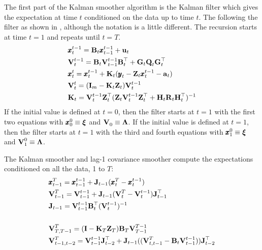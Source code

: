 \documentclass[]{article}
\def\xixi{\mbox{\boldmath $\xi$}}
\def\LAM{\mbox{\boldmath $\Lambda$}}
\def\UPS{\mbox{\boldmath $\Upsilon$}}
\def\XI{\mbox{\boldmath $\Xi$}}
\def\BB{\mbox{$\mathbf B$}}	\def\bb{\mbox{$\mathbf b$}} \def\Bb{\mbox{$\mathbf J$}} \def\Ba{\mbox{$\mathbf L$}} \def\Bm{\UPS}
\def\GG{\mbox{$\mathbf G$}}	\def\gg{\mbox{$\mathbf g$}}
\def\HH{\mbox{$\mathbf H$}}	\def\hh{\mbox{$\mathbf h$}}
\def\II{\mbox{$\mathbf I$}} \def\ii{\mbox{$\mathbf i$}}
\def\JJ{\mbox{$\mathbf J$}}
\def\KK{\mbox{$\mathbf K$}}
\def\QQ{\mbox{$\mathbf Q$}}	 \def\qq{\mbox{$\mathbf q$}} \def\Qb{\mbox{$\mathbf G$}}  \def\Qm{\mathbb{Q}}
\def\RR{\mbox{$\mathbf R$}}	 \def\rr{\mbox{$\mathbf r$}} \def\Rb{\mbox{$\mathbf H$}}	\def\Rm{\mathbb{R}}
\def\VV{\mbox{$\mathbf V$}}	\def\vv{\mbox{$\mathbf v$}}
\def\ZZ{\mbox{$\mathbf Z$}}	\def\zz{\mbox{$\mathbf z$}}	\def\Zb{\mbox{$\mathbf M$}} \def\Za{\mbox{$\mathbf N$}} \def\Zm{\XI}
\begin{document}
The first part of the Kalman smoother algorithm is the Kalman filter which gives the expectation at time $t$ conditioned on the data up to time $t$.  The following the filter as shown in \citep[section 6.2, p. 331]{ShumwayStoffer2006}, although the notation is a little different. The recursion starts at time $t=1$ and repeats until $t=T$.
\begin{subequations}\label{eq:kffilter}
\begin{align}
&\xx_t^{t-1}=\BB_t\xx_{t-1}^{t-1}+\uu_t\label{eq:xtt1}\\
&\VV_t^{t-1}=\BB_t\VV_{t-1}^{t-1}\BB_t^\top + \GG_t\QQ_t\GG_t^\top\label{eq:Vtt1}\\
&\xx_t^t=\xx_t^{t-1}+\KK_t(\yy_t-\ZZ_t\xx_t^{t-1}-\aa_t)\label{eq:xtt}\\
&\VV_t^t=(\II_m-\KK_t\ZZ_t)\VV_t^{t-1}\label{eq:Vtt}\\
&\KK_t=\VV_t^{t-1}\ZZ_t^\top(\ZZ_t\VV_t^{t-1}\ZZ_t^\top+\HH_t\RR_t\HH_t^\top)^{-1}\label{eq:Kt}
\end{align}
\end{subequations}
If the initial value is defined at $t=0$, then the filter starts at $t=1$ with the first two equations with $\xx_{0}^{0} \equiv \xixi$ and $\VV_{0}^{}\equiv\LAM$. If the initial value is defined at $t=1$, then the filter starts at $t=1$ with the third and fourth equations with $\xx_{1}^{0}\equiv\xixi$ and $\VV_{1}^{0}\equiv\LAM$.


The Kalman smoother and lag-1 covariance smoother compute the expectations conditioned on all the data, 1 to $T$:
\begin{subequations}\label{eq:kfsmoother}
\begin{align}
&\xx_{t-1}^T=\xx_{t-1}^{t-1}+\JJ_{t-1}(\xx_t^T-\xx_t^{t-1})\label{eq:xt1T}\\
&\VV_{t-1}^T=\VV_{t-1}^{t-1}+\JJ_{t-1}(\VV_t^T-\VV_t^{t-1})\JJ_{t-1}^\top\label{eq:Vt1T}\\
&\JJ_{t-1}=\VV_{t-1}^{t-1}\BB_t^\top(\VV_t^{t-1})^{-1}\label{eq:Jt}\\
\\
&\VV_{T,T-1}^T=(\II-\KK_T\ZZ_T)\BB_T\VV_{T-1}^{T-1}\label{eq:VTT1T}\\
&\VV_{t-1,t-2}^T=\VV_{t-1}^{t-1}\JJ_{t-2}^\top + \JJ_{t-1}((\VV_{t,t-1}^T-\BB_t\VV_{t-1}^{t-1}))\JJ_{t-2}^\top\label{eq:Vtt1T}
\end{align}
\end{subequations}
\end{document}

